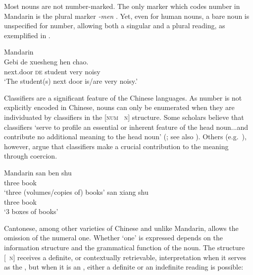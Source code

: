 \documentclass[output=paper,chinesefont,hidelinks]{langscibook}
\begin{document}
Most nouns are not number-marked. The only marker which codes number in Mandarin is the plural marker \textit{-men} \citep{HsiehHongHuang2022}. Yet, even for human nouns, a bare noun is unspecified for number, allowing both a singular and a plural reading, as exemplified in .

\ea%
    \label{ex:Sinitic:5} Mandarin\\
   \gll Gebi    de   xuesheng   hen   chao.\\
         next.door   \textsc{de}  student   very  noisy\\
    \glt `The student(s) next door is/are very noisy.'
    \z

    Classifiers are a significant feature of the Chinese languages. As number is not explicitly encoded in Chinese, nouns can only be enumerated when they are individuated by classifiers in the [\textsc{num \CLF\ n}] structure. Some scholars believe that classifiers `serve to profile an essential or inherent feature of the head noun...and contribute no additional meaning to the head noun' (\citealt{Her2012a}; see also \citealt{ChengSybesma1999}). Others (e.g.\ \citealt{HuangAhrens2003,ChenAhrensHuang2022}), however, argue that classifiers make a crucial contribution to the meaning through coercion.

\ea%
    \label{ex:Sinitic:6} Mandarin
\ea    \gll san  ben  shu\\
         three  {\CLF}  book\\
    \glt`three (volumes/copies of) books'
\ex    \gll san  xiang  shu\\
         three   {\CLF}  book\\
    \glt `3 boxes of books'
    \z\z

    Cantonese, among other varieties of Chinese and unlike Mandarin, allows the omission of the numeral one. Whether `one' is expressed depends on the information structure and the grammatical function of the noun. The structure [\CLF~\textsc{n}] receives a definite, or contextually retrievable, interpretation when it serves as the \SUBJ, but when it is an \OBJ, either a definite or an indefinite reading is possible:
\end{document}
